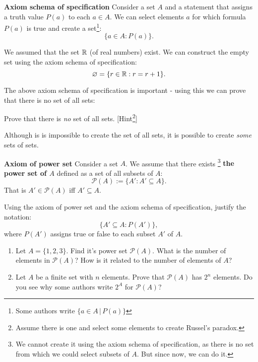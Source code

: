 \begin{definition}
  \textbf{Axiom schema of specification} Consider a set $A$ and a statement that assigns a truth value $P(a)$ to each $a\in A$. We can select elements $a$
  for which formula $P(a)$ is true and create a set\footnote{Some authors write $\{a\in A\,|\,P(a)\}$}:
  $$\{a\in A : P(a)\}.$$
\end{definition}

\begin{example}
  We assumed that the set $\mathbb R$ (of real numbers) exist. We can construct the empty set using the axiom schema of specification:
  $$\varnothing=\{r\in\mathbb R : r=r+1\}.$$
\end{example}

The above axiom schema of specification is important - using this we can prove that there is no set of all sets:
\begin{exercise}
  Prove that there is \textit{no} set of all sets. [Hint\footnote{Assume there is one and select some elements to create Russel's paradox.}]
\end{exercise}

Although is is impossible to create the set of all sets, it is possible to create \textit{some} sets of sets.

\begin{definition}
  \textbf{Axiom of power set} Consider a set $A$. We assume that there exists
  \footnote{We cannot create it using the axiom schema of specification, as there is no set from which we could select subsets of $A$. But since now, we can do it.}
  \textbf{the power set of $A$} defined as a set of all subsets of $A$:
  $$\mathcal P(A):=\{A' : A'\subseteq A\}.$$
  That is $A'\in \mathcal P(A)$ iff $A'\subseteq A$.
\end{definition}

\begin{exercise}
  Using the axiom of power set and the axiom schema of specification, justify the notation:
  $$\{A'\subseteq A : P(A')\},$$
  where $P(A')$ assigns true or false to each subset $A'$ of $A$.
\end{exercise}

\begin{exercise}
  \begin{enumerate}
    \item Let $A=\{1,2,3\}$. Find it's power set $\mathcal P(A)$. What is the number of elements in $\mathcal P(A)$? How is it related to the
      number of elements of $A$?
    \item Let $A$ be a finite set with $n$ elements. Prove that $\mathcal P(A)$ has $2^n$ elements.
      Do you see why some authors write $2^A$ for $\mathcal P(A)$?
  \end{enumerate}
\end{exercise}

